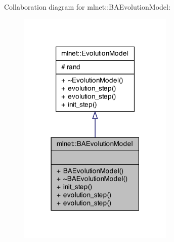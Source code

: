 Collaboration diagram for mlnet\+:\+:B\+A\+Evolution\+Model\+:\nopagebreak
\begin{figure}[H]
\begin{center}
\leavevmode
\includegraphics[width=210pt]{classmlnet_1_1_b_a_evolution_model__coll__graph}
\end{center}
\end{figure}
